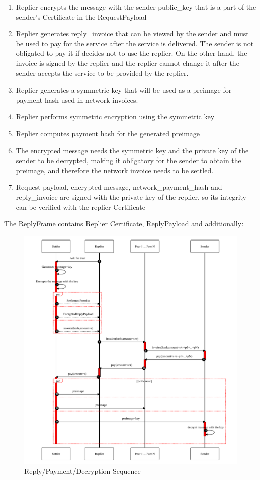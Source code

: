 \documentclass{article}
\begin{document}
\begin{enumerate}
	\item Replier encrypts the message with the sender public\_key that is a part of the sender's Certificate in the RequestPayload
	\item Replier generates reply\_invoice that can be viewed by the sender and must be used to pay for the service after the service is delivered. The sender is not obligated to pay it if decides not to use the replier. On the other hand, the invoice is signed by the replier and the replier cannot change it after the sender accepts the service to be provided by the replier.
	\item Replier generates a symmetric key that will be used as a preimage for payment hash used in network invoices.
	\item Replier performs symmetric encryption using the symmetric key
	\item Replier computes payment hash for the generated preimage
	\item The encrypted message needs the symmetric key and the private key of the sender to be decrypted, making it obligatory for the sender to obtain the preimage, and therefore the network invoice needs to be settled.
	\item Request payload, encrypted message, network\_payment\_hash and reply\_invoice are signed with the private key of the replier, so its integrity can be verified with the replier Certificate
\end{enumerate}

The ReplyFrame contains Replier Certificate, ReplyPayload and additionally:

\begin{figure}
	\centering
	\includegraphics[scale=0.8]{ReplyAndPay.pdf}
	\caption{Reply/Payment/Decryption Sequence}
	\label{fig:replyandpay}
\end{figure}
\end{document}
